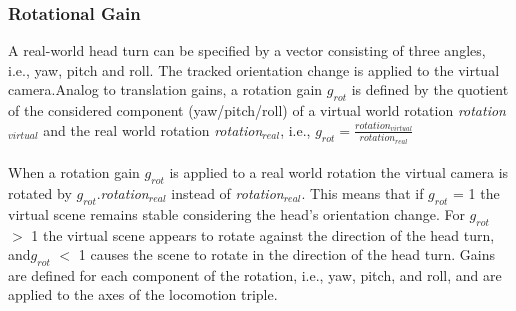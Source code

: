 \documentclass[12pt]{article}
\begin{document}
\subsubsection{Rotational Gain}
A real-world head turn can be specified by a vector consisting of three angles, i.e., yaw, pitch and roll. The tracked orientation change is applied to the virtual camera.Analog to translation gains, a rotation gain $g_{rot}$ is defined by the quotient of the considered component (yaw/pitch/roll) of a virtual world rotation \textit{rotation}$_{virtual}$ and the real world rotation \textit{rotation}$_{real}$, i.e.,
$g_{rot} = \frac{rotation_{virtual}}{rotation_{real}}$\\
\\
When a rotation gain $g_{rot}$ is applied to a real world rotation the virtual camera is rotated by $g_{rot}$.\textit{rotation}$_{real}$ instead of \textit{rotation}$_{real}$. This means that if $g_{rot}$ = 1 the virtual scene remains stable considering the head’s orientation change. For $g_{rot}$ $>$ 1 the virtual scene appears to rotate against the direction of the head turn, and$g_{rot}$ $<$ 1 causes the scene to rotate in the direction of the head turn. Gains are defined for each component of the rotation, i.e., yaw, pitch, and roll, and are applied to the axes of the locomotion triple.
\end{document}
